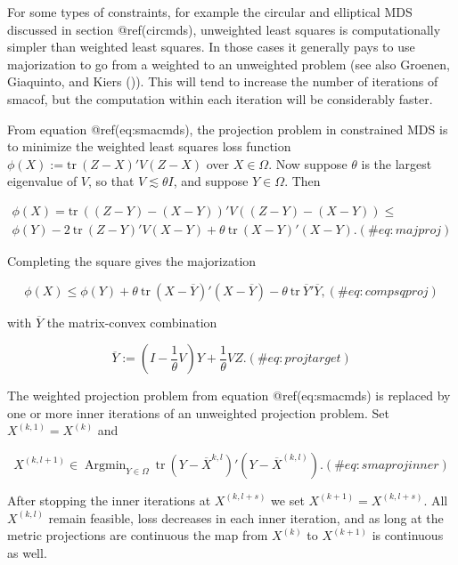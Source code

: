 \documentclass[
  12pt,
  letterpaper,
  DIV=11,
  numbers=noendperiod]{scrreprt}
\theoremstyle{remark}
\begin{document}
For some types of constraints, for example the circular and elliptical
MDS discussed in section @ref(circmds), unweighted least squares is
computationally simpler than weighted least squares. In those cases it
generally pays to use majorization to go from a weighted to an
unweighted problem (see also Groenen, Giaquinto, and Kiers
()). This will tend to
increase the number of iterations of smacof, but the computation within
each iteration will be considerably faster.

From equation @ref(eq:smacmds), the projection problem in constrained
MDS is to minimize the weighted least squares loss function
\(\phi(X):=\text{tr}\ (Z-X)'V(Z-X)\) over \(X\in\Omega\). Now suppose
\(\theta\) is the largest eigenvalue of \(V\), so that
\(V\lesssim\theta I\), and suppose \(Y\in\Omega\). Then

\begin{multline}
\phi(X)=\text{tr}\ ((Z-Y)-(X-Y))'V((Z-Y)-(X-Y))\leq\\\phi(Y)-2\ \text{tr}\ (Z-Y)'V(X-Y)+\theta\ \text{tr}\ (X-Y)'(X-Y).
(\#eq:majproj)
\end{multline}

Completing the square gives the majorization

\begin{equation}
\phi(X)\leq\phi(Y)+\theta\ \text{tr}\ (X-\overline{Y})'(X-\overline{Y})-\theta\ \text{tr}\ \overline{Y}'\overline{Y},
(\#eq:compsqproj)
\end{equation}

with \(\overline{Y}\) the matrix-convex combination

\begin{equation}
\overline{Y}:=(I-\frac{1}{\theta}V)Y+\frac{1}{\theta}VZ.
(\#eq:projtarget)
\end{equation}

The weighted projection problem from equation @ref(eq:smacmds) is
replaced by one or more inner iterations of an unweighted projection
problem. Set \(X^{(k,1)}=X^{(k)}\) and

\begin{equation}
X^{(k,l+1)}\in\mathop{\text{Argmin}}_{Y\in\Omega}\ \text{tr}\ (Y-\overline{X}^{k,l})'(Y-\overline{X}^{(k,l)}).
(\#eq:smaprojinner)
\end{equation}

After stopping the inner iterations at \(X^{(k,l+s)}\) we set
\(X^{(k+1)}=X^{(k,l+s)}\). All \(X^{(k,l)}\) remain feasible, loss
decreases in each inner iteration, and as long at the metric projections
are continuous the map from \(X^{(k)}\) to \(X^{(k+1)}\) is continuous
as well.
\end{document}

